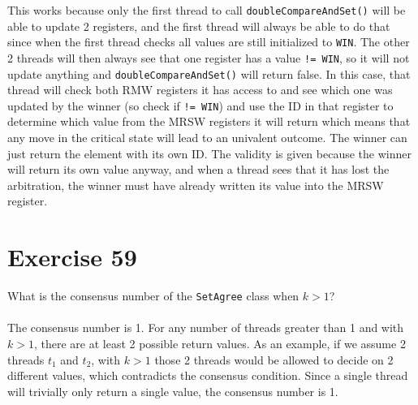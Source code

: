 \documentclass[a4paper,%
11pt,%
DIV=14,
headsepline,%
headings=normal,
]{scrartcl}
\newcommand{\exercise}[1]{\section*{Exercise #1}}
\begin{document}
This works because only the first thread to call \texttt{doubleCompareAndSet()} will be able to update 2 registers, and the first thread will always be able to do that since when the first thread checks all values are still initialized to \texttt{WIN}. The other 2 threads will then always see that one register has a value \texttt{!= WIN}, so it will not update anything and \texttt{doubleCompareAndSet()} will return false. In this case, that thread will check both RMW registers it has access to and see which one was updated by the winner (so check if \texttt{!= WIN}) and use the ID in that register to determine which value from the MRSW registers it will return which means that any move in the critical state will lead to an univalent outcome. The winner can just return the element with its own ID. The validity is given because the winner will return its own value anyway, and when a thread sees that it has lost the arbitration, the winner must have already written its value into the MRSW register.

\exercise{59}

What is the consensus number of the \texttt{SetAgree} class when $k > 1$?\\
\\
The consensus number is 1. For any number of threads greater than 1 and with $k > 1$, there are at least 2 possible return values. As an example, if we assume 2 threads $t_1$ and $t_2$, with $k > 1$ those 2 threads would be allowed to decide on 2 different values, which contradicts the consensus condition. Since a single thread will trivially only return a single value, the consensus number is 1.
\end{document}

